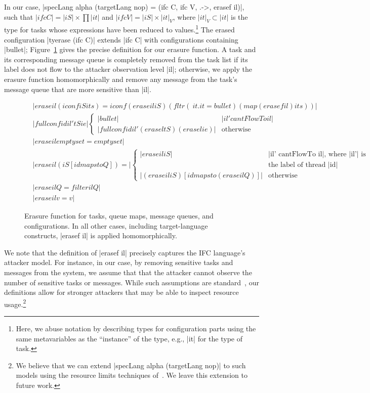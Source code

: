 In our case, |specLang alpha (targetLang nop) = (ifc C, ifc
V, .->, erasef il)|, such that $|ifc C| = |iS| \times \prod |it|$ and
$|ifc V| = |iS| \times |it|_V$, where $|it|_V \subset |it|$ is the
type for tasks whose expressions have been reduced to
values.\footnote{
  Here, we abuse notation by describing types for configuration parts using the
  same metavariables as the ``instance'' of the type, e.g., |it| for the type of
  task.
}
The erased configuration |tyerase (ifc C)| extends |ifc C| with configurations
containing |bullet|; Figure~\ref{fig:erasure} gives the precise definition for
our erasure function.
%
A task and its corresponding message queue is completely removed from the task
list if its label does not flow to the attacker observation level |il|;
otherwise, we apply the erasure function homomorphically and remove any message
from the task's message queue that are more sensitive than |il|.

\begin{figure} %
\begin{align*}
  &|erase il (iconf iS its) =
  iconf (erase il iS) (fltr (\ it . it = bullet) (map (erasef il) its))|\\
  &|fullconf id il' tS ie| \begin{cases}
    |bullet| & |il' cantFlowTo il| \\
    |fullconf id il' (erase l tS) (erase l ie)| & \text{otherwise}
  \end{cases} \\
  &|erase il emptyset = emptyset|\\
  &|erase il (iS [id mapsto Q]) =| \begin{cases}
    |erase il iS| & \text{|il' cantFlowTo il|, where |il'| is}\\
    & \text{the label of thread |id|} \\
    |(erase il iS) [id mapsto (erase il Q)]| & \text{otherwise}
  \end{cases} \\
  &|erase il Q = filter il Q|\\
  &|erase il v = v|
\end{align*}
\caption{ Erasure function for tasks, queue maps, message queues, and
configurations.  In all other cases, including target-language constructs,
|erasef il| is applied homomorphically.  \label{fig:erasure} }
\end{figure}

We note that the definition of |erasef il| precisely captures the IFC
language's attacker model. 
%
For instance, in our case, by removing sensitive tasks and messages from the
system, we assume that that the attacker cannot observe the number of sensitive
tasks or messages.
%
While such assumptions are standard~\tocite{}, our definitions allow for
stronger attackers that may be able to inspect resource usage.\footnote{
  We believe that we can extend |specLang alpha (targetLang nop)| to
  such models using the resource limits techniques of~\tocite{}.
  We leave this extension to future work.
}

